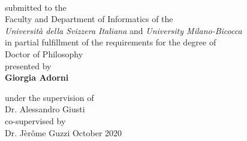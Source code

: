 \begin{center}
			
			\\[6mm]
			\vspace{10mm}
			{submitted to the}\\[2mm]
			{Faculty and Department of Informatics of the \\[2mm]  {\em{Universit\`a 
			della 
			Svizzera 
			Italiana}} and \em{University Milano-Bicocca}}\\[2mm]
			{in partial fulfillment of the requirements for the degree of}\\[2mm]
			{Doctor of Philosophy \\[32mm]}
			{presented by}\\[2mm]
			{\Large {\bf\sffamily Giorgia Adorni}}
			\vfill
			\vfill
			
			{under the supervision of}\\[2mm]
		
			{\large Dr. Alessandro Giusti}
			\\[2mm] co-supervised by\\[2mm]
			{\large Dr. Jèrôme Guzzi} 
			\vfill
			{October 2020}\\
		\end{center}
	


